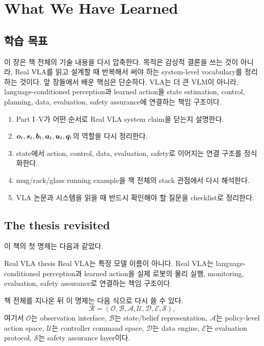 \chapter{What We Have Learned}

\section*{학습 목표}

이 장은 책 전체의 기술 내용을 다시 압축한다. 목적은 감상적 결론을 쓰는 것이 아니라, Real VLA를 읽고 설계할 때 반복해서 써야 하는 system-level vocabulary를 정리하는 것이다. 앞 장들에서 배운 핵심은 단순하다. VLA는 더 큰 VLM이 아니라, language-conditioned perception과 learned action을 state estimation, control, planning, data, evaluation, safety assurance에 연결하는 책임 구조이다.

\begin{enumerate}
  \item Part I--V가 어떤 순서로 Real VLA system claim을 닫는지 설명한다.
  \item $\bm{o}_t,\bm{s}_t,\bm{b}_t,\bm{a}_t,\bm{u}_t,\bm{q}_t$의 역할을 다시 정리한다.
  \item state에서 action, control, data, evaluation, safety로 이어지는 연결 구조를 정식화한다.
  \item mug/rack/glass running example을 책 전체의 stack 관점에서 다시 해석한다.
  \item VLA 논문과 시스템을 읽을 때 반드시 확인해야 할 질문을 checklist로 정리한다.
\end{enumerate}

\section{The thesis revisited}

이 책의 첫 명제는 다음과 같았다.

\begin{definitionbox}{Real VLA thesis}
Real VLA는 특정 모델 이름이 아니다. Real VLA는 language-conditioned perception과 learned action을 실제 로봇의 물리 실행, monitoring, evaluation, safety assurance로 연결하는 책임 구조이다.
\end{definitionbox}

책 전체를 지나온 뒤 이 명제는 다음 식으로 다시 쓸 수 있다.
\begin{equation}
  \mathcal{R}
  =
  (
  \mathcal{O},
  \mathcal{B},
  \mathcal{A},
  \mathcal{U},
  \mathcal{D},
  \mathcal{E},
  \mathcal{S}
  ),
  \label{eq:ch21-real-vla-contract}
\end{equation}
여기서 $\mathcal{O}$는 observation interface, $\mathcal{B}$는 state/belief representation, $\mathcal{A}$는 policy-level action space, $\mathcal{U}$는 controller command space, $\mathcal{D}$는 data engine, $\mathcal{E}$는 evaluation protocol, $\mathcal{S}$는 safety assurance layer이다.

